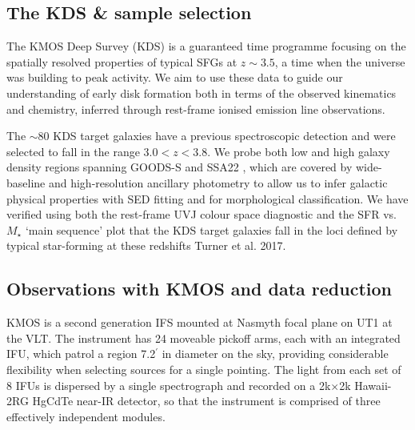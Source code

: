 \documentclass[a4paper,fleqn,usenatbib]{mn2e}
\begin{document}
\subsection{The KDS \& sample selection}\label{subsec:sample_selection}
The KMOS Deep Survey (KDS) is a guaranteed time programme focusing on the spatially resolved properties of typical SFGs at $z\sim3.5$, a time when the universe was building to peak activity.
We aim to use these data to guide our understanding of early disk formation both in terms of the observed kinematics and chemistry, inferred through rest-frame ionised emission line observations.

The $\sim80$ KDS target galaxies have a previous spectroscopic detection and were selected to fall in the range $3.0 < z < 3.8$.
We probe both low and high galaxy density regions spanning GOODS-S \citep[e.g.][]{Koekemoer2011,Grogin2011,Guo2013} and SSA22 \citep[e.g.][]{Steidel1998}, which are covered by wide-baseline and high-resolution ancillary photometry to allow us to infer galactic physical properties with SED fitting and for morphological classification.
We have verified using both the rest-frame UVJ colour space diagnostic and the SFR vs. $M_{\star}$ `main sequence' plot that the KDS target galaxies fall in the loci defined by typical star-forming at these redshifts Turner et al. 2017. 
\subsection{Observations with KMOS and data reduction}\label{subsec:kmos_observations}
KMOS is a second generation IFS mounted at Nasmyth focal plane on UT1 at the VLT.
The instrument has 24 moveable pickoff arms, each with an integrated IFU, which patrol a region 7.2$^{\prime}$ in diameter on the sky, providing considerable flexibility when selecting sources for a single pointing.
The light from each set of 8 IFUs is dispersed by a single spectrograph and recorded on a 2k$\times$2k Hawaii-2RG HgCdTe near-IR detector, so that the instrument is comprised of three effectively independent modules.
\end{document}
